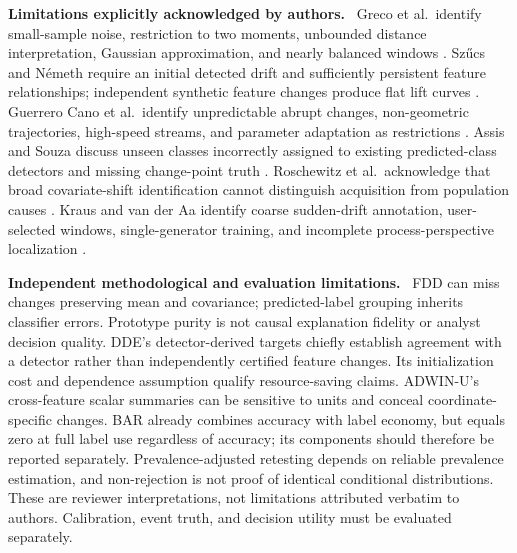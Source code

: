 \documentclass[10pt,a4paper]{article}
\newcommand{\lead}[1]{\textbf{#1}\ }
\begin{document}
\lead{Limitations explicitly acknowledged by authors.}
Greco et al.\ identify small-sample noise, restriction to two moments, unbounded distance interpretation, Gaussian approximation, and nearly balanced windows \cite[Sec.~VI]{greco}. Sz\H{u}cs and N\'emeth require an initial detected drift and sufficiently persistent feature relationships; independent synthetic feature changes produce flat lift curves \cite[Secs.~4.3,5.2,6]{szucs}. Guerrero Cano et al.\ identify unpredictable abrupt changes, non-geometric trajectories, high-speed streams, and parameter adaptation as restrictions \cite[Secs.~3.3,4.2,7]{guerrero}. Assis and Souza discuss unseen classes incorrectly assigned to existing predicted-class detectors and missing change-point truth \cite[Sec.~6.3]{assis}. Roschewitz et al.\ acknowledge that broad covariate-shift identification cannot distinguish acquisition from population causes \cite[Sec.~5]{roschewitz}. Kraus and van der Aa identify coarse sudden-drift annotation, user-selected windows, single-generator training, and incomplete process-perspective localization \cite[Conclusion]{kraus}.

\lead{Independent methodological and evaluation limitations.}
FDD can miss changes preserving mean and covariance; predicted-label grouping inherits classifier errors. Prototype purity is not causal explanation fidelity or analyst decision quality. DDE's detector-derived targets chiefly establish agreement with a detector rather than independently certified feature changes. Its initialization cost and dependence assumption qualify resource-saving claims. ADWIN-U's cross-feature scalar summaries can be sensitive to units and conceal coordinate-specific changes. BAR already combines accuracy with label economy, but equals zero at full label use regardless of accuracy; its components should therefore be reported separately. Prevalence-adjusted retesting depends on reliable prevalence estimation, and non-rejection is not proof of identical conditional distributions. These are reviewer interpretations, not limitations attributed verbatim to authors. Calibration, event truth, and decision utility must be evaluated separately.

\newpage
\end{document}
